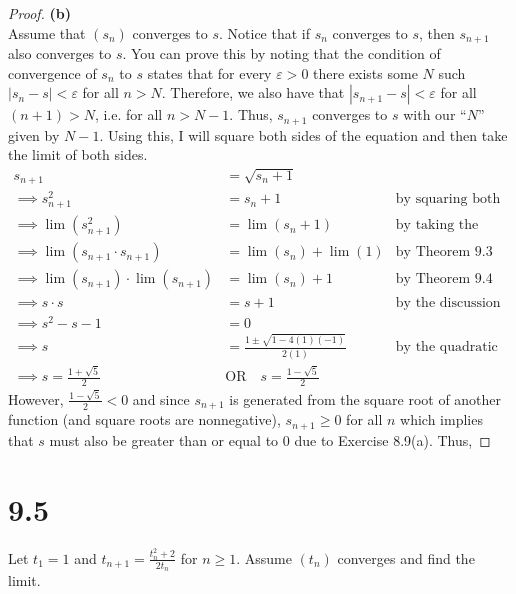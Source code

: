 \documentclass[10pt,a4paper]{article}
\theoremstyle{definition}
\begin{document}
\begin{proof}{\textbf{(b)}}
\\Assume that $(s_n)$ converges to $s$. Notice that if $s_n$ converges to $s$, then $s_{n + 1}$ also converges to $s$. You can prove this by noting that the condition of convergence of $s_n$ to $s$ states that for every $\varepsilon > 0$ there exists some $N$ such $|s_n - s| < \varepsilon$ for all $n > N$. Therefore, we also have that $|s_{n + 1} - s| < \varepsilon$ for all $(n + 1) > N$, i.e. for all $n > N - 1$. Thus, $s_{n + 1}$ converges to $s$ with our \enquote{$N$} given by $N - 1$. Using this, I will square both sides of the equation and then take the limit of both sides.
\begin{align*}
s_{n + 1} &= \sqrt{s_n + 1}\\
\implies s_{n + 1}^2 &= s_n + 1 &\text{by squaring both sides}\\
\implies \lim(s_{n + 1}^2) &= \lim(s_n + 1) &\text{by taking the limit of both sides}\\
\implies \lim(s_{n + 1} \cdot s_{n + 1}) &= \lim(s_n) + \lim(1) &\text{by Theorem 9.3 on the right}\\
\implies \lim(s_{n + 1})\cdot \lim(s_{n + 1}) &= \lim(s_n) + 1 &\text{by Theorem 9.4 on the left}\\
\implies s \cdot s &= s + 1 &\text{by the discussion of the limits above}\\
\implies s^2 - s - 1 &= 0\\
\implies s &= \frac{1 \pm \sqrt{1 - 4(1)(-1)}}{2(1)} &\text{by the quadratic formula}\\
\implies s = \frac{1 + \sqrt{5}}{2} \quad &\text{OR} \quad s = \frac{1 - \sqrt{5}}{2}
\end{align*}
However, $\displaystyle \frac{1 - \sqrt{5}}{2} < 0$ and since $s_{n + 1}$ is generated from the square root of another function (and square roots are nonnegative), $s_{n + 1} \geq 0$ for all $n$ which implies that $s$ must also be greater than or equal to 0 due to Exercise 8.9(a). Thus, 
\end{proof}

\section*{9.5}
Let $t_1 = 1$ and $\displaystyle t_{n + 1} = \frac{t_n^2 + 2}{2t_n}$ for $n \geq 1$. Assume $(t_n)$ converges and find the limit. 
\end{document}
